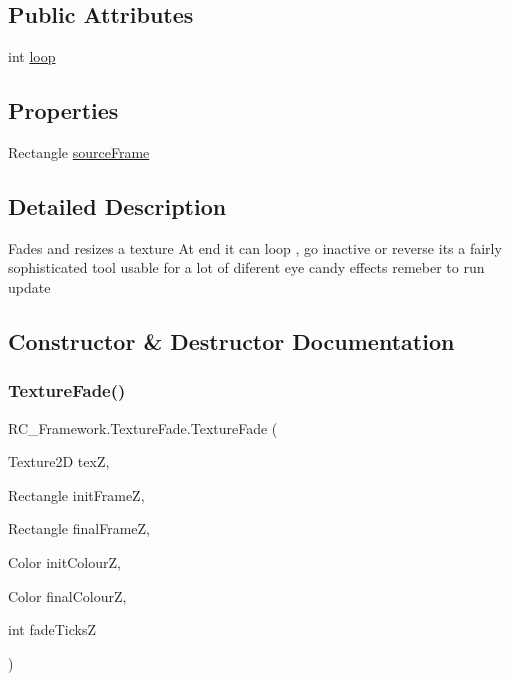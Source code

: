 \subsection*{Public Attributes}
\begin{DoxyCompactItemize}
\item 
int \mbox{\hyperlink{class_r_c___framework_1_1_texture_fade_a091378e0d56f4660a4343ae07b8c6752}{loop}}
\end{DoxyCompactItemize}
\subsection*{Properties}
\begin{DoxyCompactItemize}
\item 
Rectangle \mbox{\hyperlink{class_r_c___framework_1_1_texture_fade_ae8f66abd6538dadde56f9c91d67830a4}{source\+Frame}}
\end{DoxyCompactItemize}


\subsection{Detailed Description}
Fades and resizes a texture At end it can loop , go inactive or reverse its a fairly sophisticated tool usable for a lot of diferent eye candy effects remeber to run update 



\subsection{Constructor \& Destructor Documentation}
\mbox{\label{class_r_c___framework_1_1_texture_fade_a0dfbfacb81bed73fb9bca98c2aafc6de}} 
\subsubsection{\texorpdfstring{Texture\+Fade()}{TextureFade()}}
{\footnotesize\ttfamily R\+C\+\_\+\+Framework.\+Texture\+Fade.\+Texture\+Fade (\begin{DoxyParamCaption}\item[{Texture2D}]{texZ,  }\item[{Rectangle}]{init\+FrameZ,  }\item[{Rectangle}]{final\+FrameZ,  }\item[{Color}]{init\+ColourZ,  }\item[{Color}]{final\+ColourZ,  }\item[{int}]{fade\+TicksZ }\end{DoxyParamCaption})}



